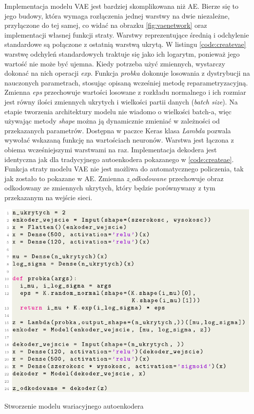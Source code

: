 \documentclass[a4paper,12pt,oneside]{book} %
\begin{document}
Implementacja modelu VAE jest bardziej skomplikowana niż AE. Bierze się to jego budowy, która wymaga rozłączenia jednej warstwy na dwie niezależne, przyłączone do tej samej, co widać na obrazku \ref{fig:vaenetwork} oraz implementacji własnej funkcji straty. Warstwy reprezentujące średnią i odchylenie standardowe są połączone z ostatnią warstwą ukrytą. W listingu \ref{code:createvae} warstwę odchyleń standardowych traktuje się jako ich logarytm, ponieważ jego wartość nie może być ujemna. Kiedy potrzeba użyć zmiennych, wystarczy dokonać na nich operacji \textit{exp}. Funkcja \textit{probka} dokonuje losowania z dystrybucji na nauczonych parametrach, stosując opisaną wcześniej metodę reparametryzacyjną. Zmienna \textit{eps} przechowuje wartości losowane z rozkładu normalnego i ich rozmiar jest równy ilości zmiennych ukrytych i wielkości partii danych (\textit{batch size}). Na etapie tworzenia architektury modelu nie wiadomo o wielkości batch-a, więc używając metody \textit{shape} można ją dynamicznie zmieniać w zależności od przekazanych parametrów. Dostępna w paczce Keras klasa \textit{Lambda} pozwala wywołać wskazaną funkcję na wartościach neuronów. Warstwa jest łączona z obiema wcześniejszymi warstwami na raz. Implementacja dekodera jest identyczna jak dla tradycyjnego autoenkodera pokazanego w \ref{code:createae}. Funkcja straty modelu VAE nie jest możliwa do automatycznego policzenia, tak jak zostało to pokazane w AE. Zmienna \textit{z$\_$odkodowane} przechowuje obraz odkodowany ze zmiennych ukrytych, który będzie porównywany z tym przekazanym na wejście sieci.

\begin{code}[h!]
	\centering
	\includegraphics[width=\linewidth]{modelvae.pdf}
	\caption{Stworzenie modelu wariacyjnego autoenkodera}
	\label{code:createvae}
\end{code}
\end{document}
